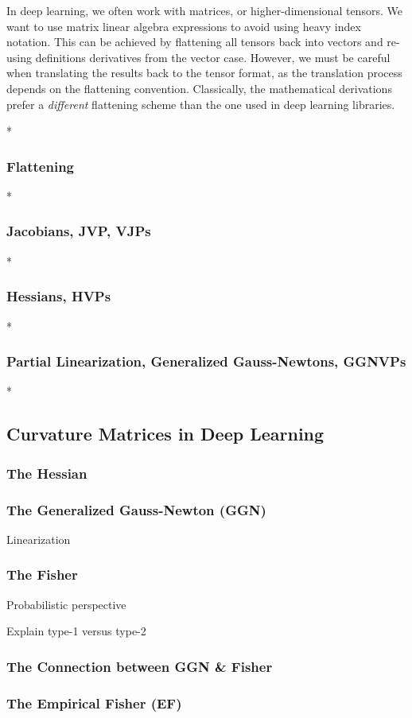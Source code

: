 \begin{caveat}
  In deep learning, we often work with matrices, or higher-dimensional tensors.
  We want to use matrix linear algebra expressions to avoid using heavy index notation.
  This can be achieved by flattening all tensors back into vectors and re-using definitions derivatives from the vector case.
  However, we must be careful when translating the results back to the tensor format, as the translation process depends on the flattening convention.
  Classically, the mathematical derivations prefer a \emph{different} flattening scheme than the one used in deep learning libraries.
\end{caveat}

\switchcolumn[0]*
\subsubsection{Flattening}


\switchcolumn[0]*
\subsubsection{Jacobians, JVP, VJPs}


\switchcolumn[0]*
\subsubsection{Hessians, HVPs}


\switchcolumn[0]*
\subsubsection{Partial Linearization, Generalized Gauss-Newtons, GGNVPs}


\switchcolumn[0]*
\subsection{Curvature Matrices in Deep Learning}
\subsubsection{The Hessian}

\subsubsection{The Generalized Gauss-Newton (GGN)}
Linearization

\subsubsection{The Fisher}
Probabilistic perspective

Explain type-1 versus type-2
\subsubsection{The Connection between GGN \& Fisher}
\subsubsection{The Empirical Fisher (EF)}

